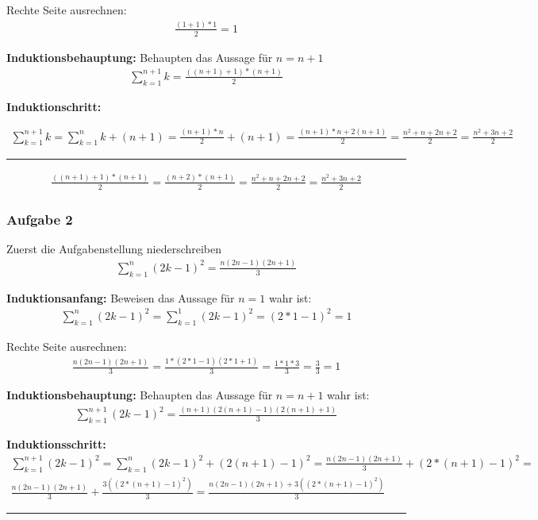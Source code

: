 \documentclass{article}
\begin{document}
\noindent Rechte Seite ausrechnen:
\begin{align*}
    \frac{(1 + 1) * 1}{2} = 1
\end{align*}


\noindent \textbf{Induktionsbehauptung:} Behaupten das Aussage für $ n = n + 1 $
\begin{align*}
    \sum_{k=1}^{n + 1}k = \frac{((n + 1) + 1) * (n + 1)}{2}
\end{align*}

\noindent \textbf{Induktionschritt:}

\begin{align*}
    \sum_{k=1}^{n + 1}k  = \sum_{k=1}^{n}k + (n + 1) = \frac{(n + 1) * n}{2} +  (n + 1) = \frac{(n + 1) * n + 2(n + 1)}{2} = \frac{n^2 + n + 2n + 2}{2} = \frac{n^2 + 3n + 2}{2}
\end{align*}
\hrule
\begin{align*}
    \frac{((n + 1) + 1) * (n + 1)}{2} = \frac{(n + 2) * (n + 1)}{2} = \frac{n^2 + n +2n + 2}{2} = \frac{n^2 + 3n + 2}{2}
\end{align*}

\subsubsection{Aufgabe 2}


\noindent Zuerst die Aufgabenstellung niederschreiben
\begin{align*}
    \sum_{k=1}^{n} (2k - 1)^{2}  = \frac{n(2n - 1)(2n + 1)}{3}
\end{align*}

\noindent \textbf{Induktionsanfang:} Beweisen das Aussage für $ n  = 1 $ wahr ist:
\begin{align*}
    \sum_{k=1}^{n} (2k - 1)^{2}  = \sum_{k=1}^{1} (2k - 1)^{2} =  (2 * 1 - 1)^{2} =  1
\end{align*}

\noindent Rechte Seite ausrechnen:
\begin{align*}
    \frac{n(2n - 1)(2n + 1)}{3} =     \frac{1 * (2 * 1 - 1)(2 * 1 + 1)}{3} = \frac{1 * 1 * 3}{3} = \frac{3}{3} =  1 
\end{align*}



\noindent \textbf{Induktionsbehauptung:} Behaupten das Aussage für $ n =  n + 1 $ wahr ist:
\begin{align*}
    \sum_{k=1}^{n + 1} (2k - 1)^{2}  = \frac{(n + 1)(2 (n + 1) - 1)(2(n + 1) + 1)}{3}
\end{align*}


\noindent \textbf{Induktionsschritt:}
\begin{align*}
    \sum_{k=1}^{n + 1} (2k - 1)^{2} =  \sum_{k=1}^{n} (2k - 1)^{2} + (2(n + 1) - 1)^{2} = \frac{n(2n - 1)(2n + 1)}{3} + (2 * (n + 1) - 1)^2 = \\
     \frac{n(2n - 1)(2n + 1)}{3} + \frac{3((2 * (n + 1) - 1)^2)}{3} = \frac{n(2n - 1)(2n + 1)+ 3((2 * (n + 1) - 1)^2)}{3} 
\end{align*}

\hrule

\begin{align*}
\end{align*}
\end{document}
